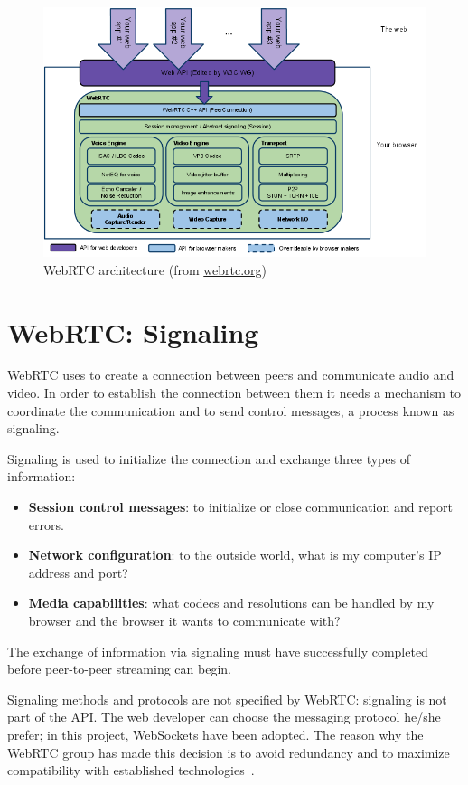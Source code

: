 \begin{figure}[ht]
  \centering
  \includegraphics[keepaspectratio=true, width=\textwidth]{images/webrtcArchitecture}\caption{WebRTC architecture (from \url{webrtc.org})}
  \label{fig:webrtcArchitecture}
\end{figure}

\section{WebRTC: Signaling}
\label{sec:webrtc_signaling}
WebRTC uses \RTCPeerConnection to create a connection between peers and communicate audio and video. In order to establish the connection between them it needs a mechanism to coordinate the communication and to send control messages, a process known as signaling. 

Signaling is used to initialize the connection and exchange three types of information:
\begin{itemize}
	\item\textbf{Session control messages}: to initialize or close communication and report errors.
	\item\textbf{Network configuration}: to the outside world, what is my computer's IP address and port?
	\item\textbf{Media capabilities}: what codecs and resolutions can be handled by my browser and the browser it wants to communicate with?
\end{itemize}
The exchange of information via signaling must have successfully completed before peer-to-peer streaming can begin.

Signaling methods and protocols are not specified by WebRTC: signaling is not part of the \RTCPeerConnection API. The web developer can choose the messaging protocol he/she prefer; in this project, WebSockets have been adopted. The reason why the WebRTC group has made this decision is to avoid redundancy and to maximize compatibility with established technologies~\cite{jsep}.

